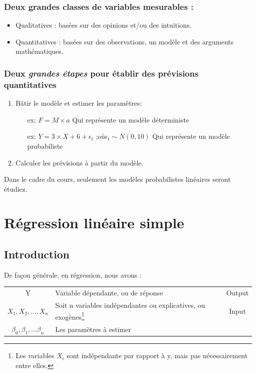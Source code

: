 \documentclass[11pt,french]{report}
\begin{document}
\subsection*{Deux grandes classes de variables mesurables :}
\begin{itemize}
\item Qualitatives : basées sur des opinions et/ou des intuitions.
\item Quantitatives : basées sur des observations, un modèle et des arguments mathématiques.
\end{itemize}

\subsection*{Deux \textit{grandes étapes} pour établir des prévisions quantitatives}
\begin{enumerate}
\item Bâtir le modèle et estimer les paramètres:
\begin{itemize}
\item[ex:] $F = M \times a$ Qui représente un modèle déterministe
\item[ex:] $Y =3 \times X + 6 + \epsilon_t \text{ ;où} \epsilon_t \sim N(0, 10)$ Qui représente un modèle probabiliste 
\end{itemize}
\item Calculer les prévisions à partir du modèle.
\end{enumerate}

\bigskip
Dans le cadre du cours, seulement les modèles probabilistes linéaires seront étudiez. 

\chapter{Régression linéaire simple}

\section{Introduction}

De façon générale, en régression, nous avons :

\begin{tabularx}{\linewidth}{c|X|c}
\hline
Y & Variable dépendante, ou de réponse & Output \\
$X_1, X_2, ..., X_n$ & Soit n variables indépendantes ou explicatives, ou exogènes\footnote{Les variables $X_i$ sont indépendante par rapport à y, mais pas nécessairement entre elles.} & Input \\
$\beta_0, \beta_1, ... \beta_n$ & Les paramètres à estimer & \\
\hline
\end{tabularx}
\end{document}

